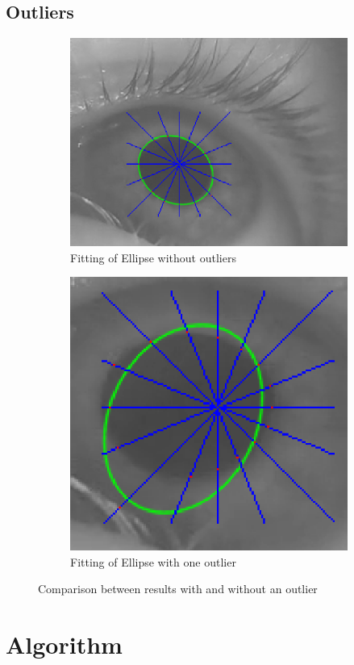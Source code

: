 \subsection{Outliers}
\begin{figure}[H]
	\begin{subfigure}{.5\textwidth}
		\centering
		\includegraphics[width=.8\linewidth]{images/good_fit_old.png}
		\caption{Fitting of Ellipse without outliers}
		\label{fig:oldGood}
	\end{subfigure}%
	\begin{subfigure}{.5\textwidth}
		\centering
		\includegraphics[width=.6\linewidth]{images/outlier_problem.png}
		\caption{Fitting of Ellipse with one outlier}
		\label{fig:oldOutlier}
	\end{subfigure}
\caption{Comparison between results with and without an outlier}
\end{figure}
\section{Algorithm}
